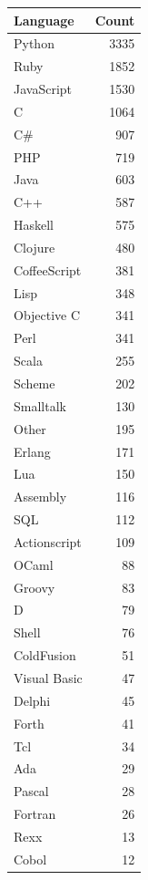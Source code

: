 \begin{tabular}{l r}
Language     & Count \\ \hline\hline
Python       & 3335 \\ \hline
Ruby         & 1852 \\ \hline
JavaScript   & 1530 \\ \hline
C            & 1064 \\ \hline
C\#          & 907 \\ \hline
PHP          & 719 \\ \hline
Java         & 603 \\ \hline
C++          & 587 \\ \hline
Haskell      & 575 \\ \hline
Clojure      & 480 \\ \hline
CoffeeScript & 381 \\ \hline
Lisp         & 348 \\ \hline
Objective C  & 341 \\ \hline
Perl         & 341 \\ \hline
Scala        & 255 \\ \hline
Scheme       & 202 \\ \hline
Smalltalk    & 130 \\ \hline
Other        & 195 \\ \hline
Erlang       & 171 \\ \hline
Lua          & 150 \\ \hline
Assembly     & 116 \\ \hline
SQL          & 112 \\ \hline
Actionscript & 109 \\ \hline
OCaml        & 88 \\ \hline
Groovy       & 83 \\ \hline
D            & 79 \\ \hline
Shell        & 76 \\ \hline
ColdFusion   & 51 \\ \hline
Visual Basic & 47 \\ \hline
Delphi       & 45 \\ \hline
Forth        & 41 \\ \hline
Tcl          & 34 \\ \hline
Ada          & 29 \\ \hline
Pascal       & 28 \\ \hline
Fortran      & 26 \\ \hline
Rexx         & 13 \\ \hline
Cobol        & 12 \\ \hline
\end{tabular}